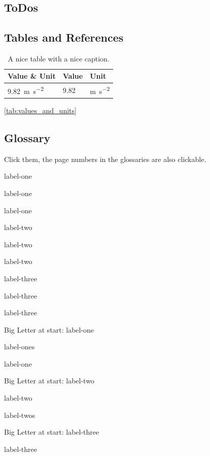 \section{}\label{sec:conclusion}

\subsection*{ToDos}

\subsection{Tables and References}

\begin{table}
  \centering
  \caption{A nice table with a nice caption.}\label{tab:values_and_units}
  \begin{tabular}{lll}
    \toprule
    Value \& Unit                        & Value & Unit
    \\
    \midrule
    \SI{9.82}{\meter\per\second\squared} & 9.82  &
    \si{\meter\per\second\squared} \\
    \bottomrule
  \end{tabular}
\end{table}

\autoref{tab:values_and_units}

\subsection{Glossary}

Click them, the page numbers in the glossaries are also clickable.

\gls{label-one}

\gls{label-one}

\gls{label-one}

\gls{label-two}

\gls{label-two}

\gls{label-two}

\gls{label-three}

\gls{label-three}

\gls{label-three}

\newpage

Big Letter at start: \Gls{label-one}

\glspl{label-one}

\gls{label-one}

Big Letter at start: \Gls{label-two}

\gls{label-two}

\glspl{label-two}

Big Letter at start: \Gls{label-three}

\gls{label-three}
